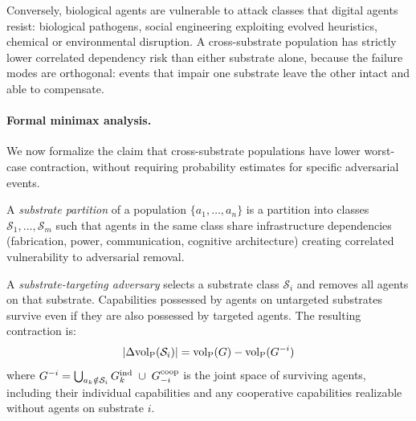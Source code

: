 Conversely, biological agents are vulnerable to attack classes that
digital agents resist: biological pathogens, social engineering exploiting
evolved heuristics, chemical or environmental disruption. A cross-substrate
population has strictly lower correlated dependency risk than either
substrate alone, because the failure modes are orthogonal: events that
impair one substrate leave the other intact and able to compensate.

\paragraph{Formal minimax analysis.} We now formalize the claim that
cross-substrate populations have lower worst-case contraction, without
requiring probability estimates for specific adversarial events.

\begin{definition}
\label{def:substrate_partition}
A \emph{substrate partition} of a population $\{a_1, \ldots, a_n\}$ is a
    partition into classes $\mathcal{S}_1, \ldots, \mathcal{S}_m$ such that
    agents in the same class share infrastructure dependencies
    (fabrication, power, communication, cognitive architecture) creating
    correlated vulnerability to adversarial removal.
\end{definition}

\begin{definition}
\label{def:substrate_adversary}
A \emph{substrate-targeting adversary} selects a substrate class
    $\mathcal{S}_i$ and removes all agents on that substrate. Capabilities
    possessed by agents on untargeted substrates survive even if they are
    also possessed by targeted agents. The resulting contraction is:
\begin{equation}
\label{eq:substrate_attack}
|\Delta {\operatorname{vol}_{\mathrm{P}}}(\mathcal{S}_i)| = {\operatorname{vol}_{\mathrm{P}}}(G) - {\operatorname{vol}_{\mathrm{P}}}(G^{-i})
\end{equation}
where $G^{-i} = \bigcup_{a_k \notin \mathcal{S}_i} G_{k}^{\mathrm{ind}} \;\cup\;
    G^{\mathrm{coop}}_{-i}$ is the joint space of surviving agents,
    including their individual capabilities and any cooperative capabilities
    realizable without agents on substrate $i$.
\end{definition}


